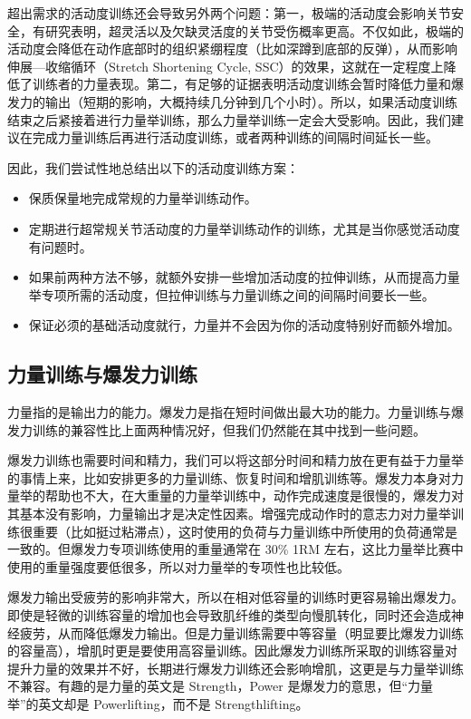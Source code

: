 \documentclass[fontset=fandol, a4paper, 12pt, openright]{ctexbook}
\begin{document}
超出需求的活动度训练还会导致另外两个问题：第一，极端的活动度会影响关节安全，有研究表明，超灵活以及欠缺灵活度的关节受伤概率更高。不仅如此，极端的活动度会降低在动作底部时的组织紧绷程度（比如深蹲到底部的反弹），从而影响伸展—收缩循环（Stretch Shortening Cycle, SSC）的效果，这就在一定程度上降低了训练者的力量表现。第二，有足够的证据表明活动度训练会暂时降低力量和爆发力的输出（短期的影响，大概持续几分钟到几个小时）。所以，如果活动度训练结束之后紧接着进行力量举训练，那么力量举训练一定会大受影响。因此，我们建议在完成力量训练后再进行活动度训练，或者两种训练的间隔时间延长一些。

因此，我们尝试性地总结出以下的活动度训练方案：
\begin{itemize}
    \item 保质保量地完成常规的力量举训练动作。
    \item 定期进行超常规关节活动度的力量举训练动作的训练，尤其是当你感觉活动度有问题时。
    \item 如果前两种方法不够，就额外安排一些增加活动度的拉伸训练，从而提高力量举专项所需的活动度，但拉伸训练与力量训练之间的间隔时间要长一些。
    \item 保证必须的基础活动度就行，力量并不会因为你的活动度特别好而额外增加。
\end{itemize}

\subsection{力量训练与爆发力训练}

力量指的是输出力的能力。爆发力是指在短时间做出最大功的能力。力量训练与爆发力训练的兼容性比上面两种情况好，但我们仍然能在其中找到一些问题。

爆发力训练也需要时间和精力，我们可以将这部分时间和精力放在更有益于力量举的事情上来，比如安排更多的力量训练、恢复时间和增肌训练等。爆发力本身对力量举的帮助也不大，在大重量的力量举训练中，动作完成速度是很慢的，爆发力对其基本没有影响，力量输出才是决定性因素。增强完成动作时的意志力对力量举训练很重要（比如挺过粘滞点），这时使用的负荷与力量训练中所使用的负荷通常是一致的。但爆发力专项训练使用的重量通常在 30\% 1RM 左右，这比力量举比赛中使用的重量强度要低很多，所以对力量举的专项性也比较低。

爆发力输出受疲劳的影响非常大，所以在相对低容量的训练时更容易输出爆发力。即使是轻微的训练容量的增加也会导致肌纤维的类型向慢肌转化，同时还会造成神经疲劳，从而降低爆发力输出。但是力量训练需要中等容量（明显要比爆发力训练的容量高），增肌时更是要使用高容量训练。因此爆发力训练所采取的训练容量对提升力量的效果并不好，长期进行爆发力训练还会影响增肌，这更是与力量举训练不兼容。有趣的是力量的英文是 Strength，Power 是爆发力的意思，但“力量举”的英文却是 Powerlifting，而不是 Strengthlifting。
\end{document}
